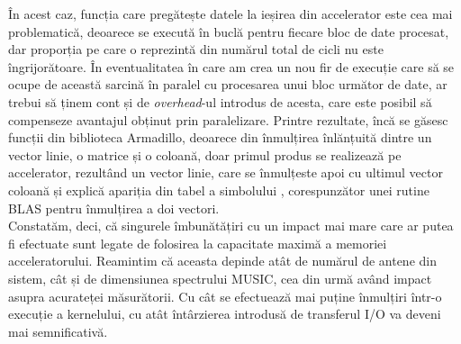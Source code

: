 În acest caz, funcția care pregătește datele la ieșirea din accelerator este cea
mai problematică, deoarece se execută în buclă pentru fiecare bloc de date procesat, dar
proporția pe care o reprezintă din numărul total de cicli nu este
îngrijorătoare. În eventualitatea în care am crea un nou fir de execuție care să
se ocupe de această sarcină în paralel cu procesarea unui bloc următor de date,
ar trebui să ținem cont și de \textit{overhead}-ul introdus de acesta, care este
posibil să compenseze avantajul obținut prin paralelizare. Printre rezultate,
încă se găsesc funcții din biblioteca Armadillo, deoarece din înmulțirea
înlănțuită dintre un vector linie, o matrice și o coloană, doar primul produs se
realizează pe accelerator, rezultând un vector linie, care se înmulțeste apoi cu
ultimul vector coloană și explică apariția din tabel a simbolului
, corespunzător unei rutine BLAS pentru înmulțirea a doi vectori.\\



Constatăm, deci, că singurele îmbunătățiri cu un impact mai mare care ar putea
fi efectuate sunt legate de folosirea la capacitate maximă a memoriei
acceleratorului. Reamintim că aceasta depinde atât de numărul de antene din
sistem, cât și de dimensiunea spectrului MUSIC, cea din urmă având impact asupra
acurateței măsurătorii. Cu cât se efectuează mai puține înmulțiri într-o
execuție a kernelului, cu atât întârzierea introdusă de transferul I/O va deveni
mai semnificativă. \\

\begin{minipage}[h]{1\textwidth}
  \centering


  \captionsetup{justification=centering}
  \label{fig:music-time-1024}
\end{minipage}


